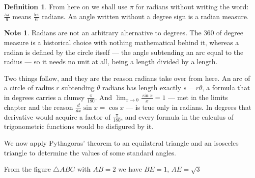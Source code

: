 \documentclass[11pt,a4paper]{article}
\theoremstyle{definition}
\newtheorem{definition}[thm]{Definition}
\newtheorem{note}[thm]{Note}
\begin{document}
\begin{definition}
From here on we shall use $\pi$ for radians without writing the word: $\frac{5\pi}{6}$
means $\frac{5\pi}{6}$ radians. An angle written without a degree sign is a radian
measure.

\begin{note}
Radians are not an arbitrary alternative to degrees. The $360$ of degree measure is
a historical choice with nothing mathematical behind it, whereas a radian is
defined by the circle itself --- the angle subtending an arc equal to the radius ---
so it needs no unit at all, being a length divided by a length.

Two things follow, and they are the reason radians take over from here. An arc of a
circle of radius $r$ subtending $\theta$ radians has length exactly $s=r\theta$, a
formula that in degrees carries a clumsy $\frac{\pi}{180}$. And
$\lim_{x\to 0}\frac{\sin x}{x}=1$ --- met in the limits chapter and the reason
$\frac{d}{dx}\sin x=\cos x$ --- is true only in radians. In degrees that derivative
would acquire a factor of $\frac{\pi}{180}$, and every formula in the calculus of
trigonometric functions would be disfigured by it.
\end{note}

We now apply Pythagoras' theorem to an equilateral triangle and an isosceles
triangle to determine the values of some standard angles.

\begin{figure}[H]
\centering
{}
\end{figure}













From the figure $\triangle ABC$ with $AB = 2$ we have $BE = 1,\, AE = \sqrt{3}$


\end{definition}
\end{document}
